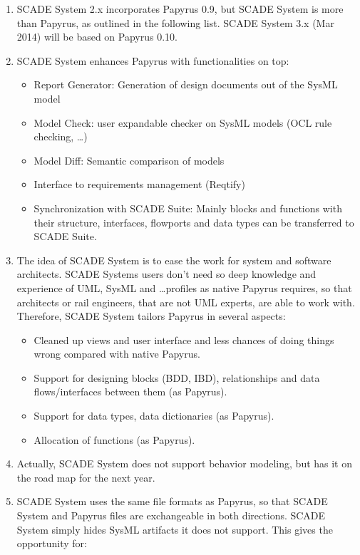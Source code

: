 \begin{enumerate}
	\item SCADE System 2.x incorporates Papyrus 0.9, but SCADE System is more than Papyrus, as outlined in the following list. SCADE System 3.x (Mar 2014) will be based on Papyrus 0.10.
	
	\item SCADE System enhances Papyrus with functionalities on top: 
	
	\begin{itemize}
		\item Report Generator: Generation of design documents out of the SysML model
		\item Model Check: user expandable checker on SysML models (OCL rule checking, …)
		\item Model Diff: Semantic comparison of models
		\item Interface to requirements management (Reqtify)
		\item Synchronization with SCADE Suite: Mainly blocks and functions with their structure, interfaces, flowports and data types can be transferred to SCADE Suite.   
	\end{itemize}
	
	\item The idea of SCADE System is to ease the work for system and software architects.  SCADE Systems users don’t need so deep knowledge and experience of UML, SysML and …profiles as native Papyrus requires, so that architects or rail engineers, that are not UML experts, are able to work with. Therefore, SCADE System tailors Papyrus in several aspects:
	
	\begin{itemize}
		\item Cleaned up views and user interface and less chances of doing things wrong compared with native Papyrus.
		\item Support for designing blocks (BDD, IBD), relationships and data flows/interfaces between them (as Papyrus).
		\item Support for data types, data dictionaries (as Papyrus).
		\item Allocation of functions (as Papyrus).
	\end{itemize}
	
	\item Actually, SCADE System does not support behavior modeling, but has it on the road map for the next year.
	\item SCADE System uses the same file formats as Papyrus, so that SCADE System and Papyrus files are exchangeable in both directions. SCADE System simply hides SysML artifacts it does not support. This gives the opportunity for:
	

\end{enumerate}
